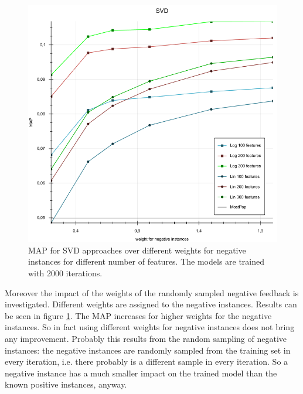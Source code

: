 \documentclass[10pt]{reportMaster}
\begin{document}
\begin{figure}[h!]
	\centering
	\includegraphics[width=1\textwidth]{figures/experiments/SVDWeights}
	\caption[MAPs for SVD approaches over different weights for negative instances]{MAP for SVD approaches over different weights for negative instances for different number of features. The models are trained with 2000 iterations.}
	\label{fig:SVDWeights}
\end{figure}

Moreover the impact of the weights of the randomly sampled negative feedback is investigated.
Different weights are assigned to the negative instances.
Results can be seen in figure \ref{fig:SVDWeights}.
The MAP increases for higher weights for the negative instances.
So in fact using different weights for negative instances does not bring any improvement.
Probably this results from the random sampling 
of negative instances: the negative instances are randomly sampled from the training set in every iteration, i.e. there probably is a different sample in every iteration.
So a negative instance has a much smaller impact on the trained model than the known positive instances, anyway.
\end{document}
